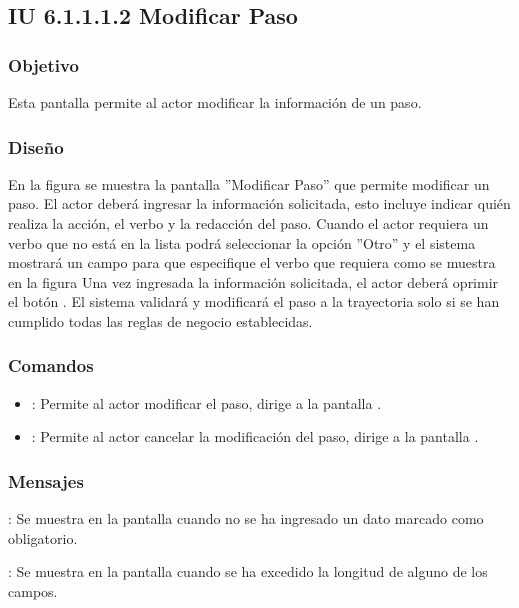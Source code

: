 \subsection{IU 6.1.1.1.2 Modificar Paso}

\subsubsection{Objetivo}
	Esta pantalla permite al actor modificar la información de un paso.
\subsubsection{Diseño}
	En la figura  se muestra la pantalla ''Modificar Paso'' que permite modificar un paso. El actor deberá ingresar la información solicitada, esto incluye indicar quién realiza la acción, el verbo y la redacción del paso.
	Cuando el actor requiera un verbo que no está en la lista podrá seleccionar la opción ''Otro'' y el sistema mostrará un campo para que especifique el verbo que requiera como se muestra en la figura 
	Una vez ingresada la información solicitada, el actor deberá oprimir el botón  . El sistema validará y modificará el paso a la trayectoria solo si se han cumplido todas las reglas de negocio establecidas.

\subsubsection{Comandos}
\begin{itemize}
	\item {}: Permite al actor modificar el paso, dirige a la pantalla .
	\item {}: Permite al actor cancelar la modificación del paso, dirige a la pantalla .
\end{itemize}

\subsubsection{Mensajes}

\begin{Citemize}
	\item {}: Se muestra en la pantalla  cuando no se ha ingresado un dato marcado como obligatorio.
	\item {}: Se muestra en la pantalla  cuando se ha excedido la longitud de alguno de los campos.
\end{Citemize}
